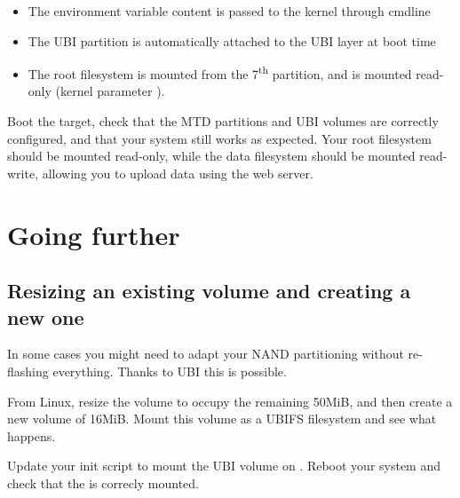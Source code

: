 \begin{itemize}
\item The  environment variable content is passed to
  the kernel through cmdline
\item The UBI partition is automatically attached to the UBI layer at
  boot time
\item The root filesystem is mounted from the 7\textsuperscript{th}
  partition, and is mounted read-only (kernel parameter
  ).
\end{itemize}

Boot the target, check that the MTD partitions and UBI volumes are
correctly configured, and that your system still works as
expected. Your root filesystem should be mounted read-only, while the
data filesystem should be mounted read-write, allowing you to upload
data using the web server.


\section{Going further}

\subsection{Resizing an existing volume and creating a new one}

In some cases you might need to adapt your NAND partitioning without
re-flashing everything. Thanks to UBI this is possible.

From Linux, resize the  volume to occupy the remaining
50MiB, and then create a new  volume of 16MiB. Mount this
volume as a UBIFS filesystem and see what happens.

Update your init script to mount the UBI  volume on .
Reboot your system and check that the  is correcly mounted.

%
%

